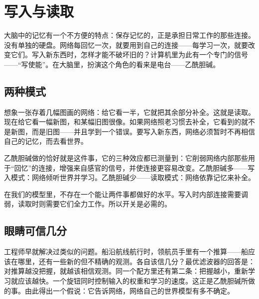 \chapter{写入与读取}

大脑中的记忆有一个不方便的特点：保存记忆的，正是承担日常工作的那些连接。没有单独的硬盘。网络每回忆一次，就要用到自己的连接——每学习一次，就要改变它们。写入新东西时，怎样才能不破坏旧的？计算机里为此有一个专门的信号——“写使能”。在大脑里，扮演这个角色的看来是电台——乙酰胆碱。

\section*{两种模式}

想象一张存着几幅图画的网络：给它看一半，它就把其余部分补全。这就是读取。现在给它看一幅新图，和某幅旧图很像。如果网络照老习惯去补全，它看到的就不是新图，而是旧图——并且学到一个错误。要写入新东西，网络必须暂时不再相信自己的记忆，而去看世界。


乙酰胆碱做的恰好就是这件事，它的三种效应都已测量到：它削弱网络内部那些用于“回忆”的连接，增强来自感官的信号，并使连接更容易改变。乙酰胆碱多——写入模式：网络倾听世界并学习。乙酰胆碱少——读取模式：网络依靠记忆来补全。

在我们的模型里，不存在一个能让两件事都做好的水平。写入时内部连接需要调弱，读取时则需要它们全力工作。所以开关是必需的。

\section*{眼睛可信几分}

工程师早就解决过类似的问题。船沿航线航行时，领航员手里有一个推算——船应该在哪里，还有一些新的但不精确的观测。各自该信几分？最优滤波器的回答是：对推算越没把握，就越该相信观测。同一个配方里还有第二条：把握越小，重新学习就应该越快。一个旋钮同时控制输入的权重和学习的速度。这正是乙酰胆碱所做的事。由此得出一个假说：它告诉网络，网络自己的世界模型有多不确定。

